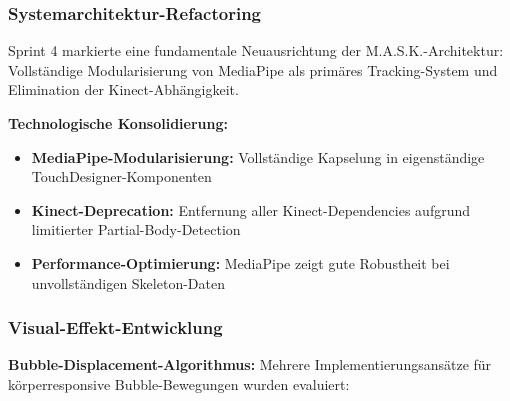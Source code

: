 \subsubsection{Systemarchitektur-Refactoring}

Sprint 4 markierte eine fundamentale Neuausrichtung der M.A.S.K.-Architektur: Vollständige Modularisierung von MediaPipe als primäres Tracking-System und Elimination der Kinect-Abhängigkeit.

\textbf{Technologische Konsolidierung:}
\begin{itemize}
    \item \textbf{MediaPipe-Modularisierung:} Vollständige Kapselung in eigenständige TouchDesigner-Komponenten
    \item \textbf{Kinect-Deprecation:} Entfernung aller Kinect-Dependencies aufgrund limitierter Partial-Body-Detection
    \item \textbf{Performance-Optimierung:} MediaPipe zeigt gute Robustheit bei unvollständigen Skeleton-Daten
\end{itemize}

\subsubsection{Visual-Effekt-Entwicklung}

\textbf{Bubble-Displacement-Algorithmus:}
Mehrere Implementierungsansätze für körperresponsive Bubble-Bewegungen wurden evaluiert:

